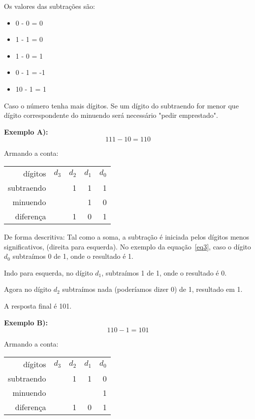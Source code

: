 Os valores das subtrações são:
\begin{itemize}
	\item 0 - 0 = 0
	\item 1 - 1 = 0
	\item 1 - 0 = 1
	\item 0 - 1 = -1
	\item 10 - 1 = 1
\end{itemize}

Caso o número tenha mais dígitos. Se um dígito do subtraendo for menor que dígito correspondente do minuendo será necessário "pedir emprestado".

\textbf{Exemplo A):}
\begin{equation}\label{eq3}
111 - 10 = 110
\end{equation}

Armando a conta:
\begin{table}[h]
	\centering
	\begin{tabular}{r|rrrr}
		dígitos		& $d_3$	& $d_2$ & $d_1$ & $d_0$ \\
		subtraendo  &  		&   1 	& 1 	& 1 \\
		minuendo 	&  		&   	& 1 	& 0 \\
		\hline
		diferença  	&  		&   1 	& 0 	& 1 \\
	\end{tabular}
\end{table}

De forma descritiva: 
Tal como a soma, a subtração é iniciada pelos dígitos menos significativos, (direita para esquerda). No exemplo da equação~\ref{eq3}, caso o dígito $d_0$ subtraímos 0 de 1, onde o resultado é 1.

Indo para esquerda, no dígito $d_1$, subtraímos 1 de 1, onde o resultado é 0.

Agora no dígito $d_2$ subtraímos nada (poderíamos dizer 0) de 1, resultado em 1.

A resposta final é 101.

\textbf{Exemplo B):}
\begin{equation}\label{eq4}
110 - 1 = 101
\end{equation}

Armando a conta:
\begin{table}[h]
	\centering
	\begin{tabular}{r|rrrr}
		dígitos		& $d_3$	& $d_2$ & $d_1$ & $d_0$ \\
		subtraendo  &  		&   1 	& 1 	& 0 \\
		minuendo 	&  		&   	& 	 	& 1 \\
		\hline
		diferença  	&  		&   1 	& 0 	& 1 \\
	\end{tabular}
\end{table}

